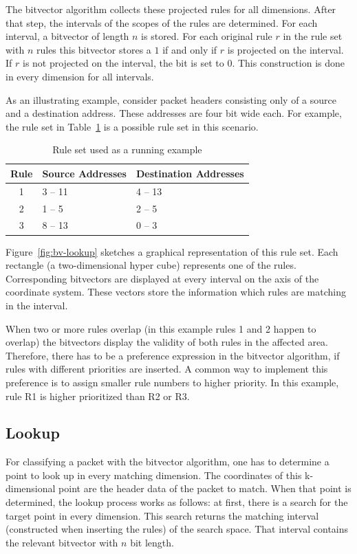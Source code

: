 \documentclass[conference]{IEEEtran}
\begin{document}
The bitvector algorithm collects these projected rules for all dimensions.
After that step, the intervals of the scopes of the rules are determined.
For each interval, a bitvector of length $n$ is stored.
For each original rule $r$ in the rule set with $n$ rules this bitvector 
stores a $1$ if and only if $r$ is projected on the interval.
If $r$ is not projected on the interval, the bit is set to $0$.
This construction is done in every dimension for all intervals.

As an illustrating example, consider packet headers consisting only of a source and a destination address.
These addresses are four bit wide each.
For example, the rule set in Table~\ref{tab:rules} is a possible rule set in this scenario.

\begin{table}
\centering
  \caption{Rule set used as a running example}
  \begin{tabularx}{0.48\textwidth}{c|X|X}
  Rule&Source Addresses&Destination Addresses\\
  \hline
  1&3 -- 11&4 -- 13\\
  2&1 -- 5&2 -- 5\\
  3&8 -- 13&0 -- 3\\
  \end{tabularx}
\label{tab:rules}
\end{table}

Figure~\ref{fig:bv-lookup} sketches a graphical representation of this rule set.
Each rectangle (a two-dimensional hyper cube) represents one of the rules.
Corresponding bitvectors are displayed at every interval on the axis of the coordinate system.
These vectors store the information which rules are matching in the interval.

When two or more rules overlap (in this example rules 1 and 2 happen 
to overlap) the bitvectors display the validity of both rules in the affected area.
Therefore, there has to be a preference expression in the bitvector algorithm, 
if rules with different priorities are inserted.
A common way to implement this preference is to assign smaller rule numbers to higher priority.
In this example, rule R1 is higher prioritized than R2 or R3.

\subsection{Lookup}
For classifying a packet with the bitvector algorithm, one has to determine a point to look up in every matching dimension.
The coordinates of this k-dimensional point are the header data of the packet to match.
When that point is determined, the lookup process works as follows:
at first, there is a search for the target point in every dimension.
This search returns the matching interval (constructed when inserting the rules) of the search space.
That interval contains the relevant bitvector with $n$ bit length.
\end{document}
